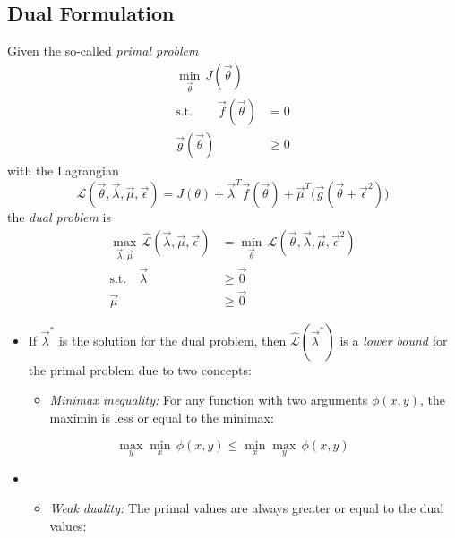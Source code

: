 		\subsection{Dual Formulation}
			Given the so-called \emph{primal problem}
			\begin{align}
				\min\limits_{\vec{\theta}} \, J(\vec{\theta}) &        \\
				\textrm{s.t.} \qquad
				\vec{f}(\vec{\theta})                         & = 0    \\
				\vec{g}(\vec{\theta})                         & \geq 0
			\end{align}
			with the Lagrangian
			\begin{equation}
				\mathcal{L}(\vec{\theta}, \vec{\lambda}, \vec{\mu}, \vec{\epsilon}) = J(\theta) + \vec{\lambda}^T\vec{f}(\vec{\theta}) + \vec{\mu}^T \big(\vec{g}(\vec{\theta} + \vec{\epsilon}^2)\big)
			\end{equation}
			the \emph{dual problem} is
			\begin{align}
				\max\limits_{\vec{\lambda}, \vec{\mu}} \, \hat{\mathcal{L}}(\vec{\lambda}, \vec{\mu}, \vec{\epsilon}) & = \min\limits_{\vec{\theta}} \, \mathcal{L}(\vec{\theta}, \vec{\lambda}, \vec{\mu}, \vec{\epsilon}^2) \\
				\textrm{s.t.} \quad
				\vec{\lambda}                                                                                         & \geq \vec{0}                                                                                          \\
				\vec{\mu}                                                                                             & \geq \vec{0}
			\end{align}
			\begin{itemize}
				\item If \( \vec{\lambda}^\ast \) is the solution for the dual problem, then \( \hat{\mathcal{L}}(\vec{\lambda}^\ast) \) is a \emph{lower bound} for the primal problem due to two concepts:
					\begin{itemize}
						\item \emph{Minimax inequality:} For any function with two arguments \( \phi(x, y) \), the maximin is less or equal to the minimax:
					\end{itemize}
			\end{itemize}
			\begin{equation}
				\max_y \min_x \, \phi(x, y) \leq \min_x \max_y \, \phi(x, y)
			\end{equation}
			\begin{itemize}
				\item[]
					\begin{itemize}
						\item \emph{Weak duality:} The primal values are always greater or equal to the dual values:
					\end{itemize}
			\end{itemize}
